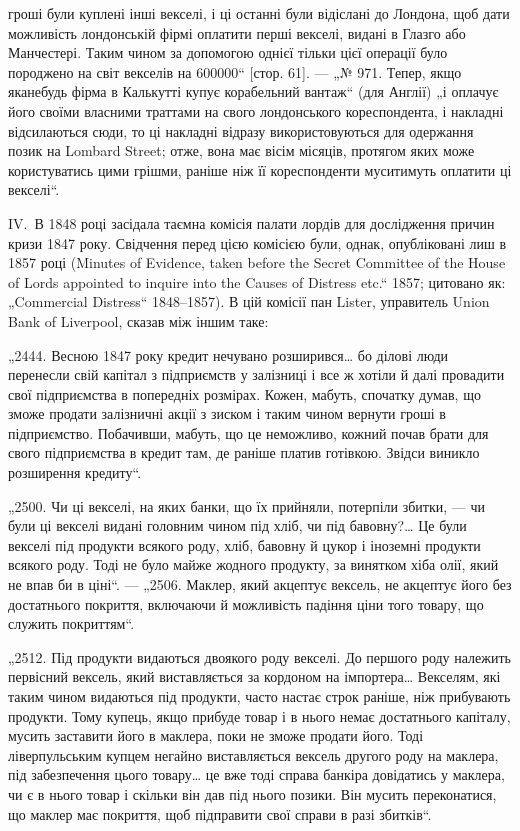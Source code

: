 гроші були куплені інші векселі, і ці останні були відіслані до Лондона,
щоб дати можливість лондонській фірмі оплатити перші векселі, видані в Глазго
або Манчестері. Таким чином за допомогою однієї тільки цієї операції було породжено
на світ векселів на \num{600000}“ [стор. 61]. — „№ 971.
Тепер, якщо яканебудь фірма в Калькутті купує корабельний вантаж“ (для Англії)
„і оплачує його своїми власними траттами на свого лондонського кореспондента,
і накладні відсилаються сюди, то ці накладні відразу використовуються для одержання позик на Lombard
Street; отже, вона має вісім місяців, протягом яких
може користуватись цими грішми, раніше ніж її кореспонденти муситимуть
оплатити ці векселі“.

IV.~В 1848 році засідала таємна комісія палати лордів для дослідження причин
кризи 1847 року. Свідчення перед цією комісією були, однак, опубліковані
лиш в 1857 році (Minutes of Evidence, taken before the Secret Committee of the
House of Lords appointed to inquire into the Causes of Distress etc.“ 1857; цитовано як: „Commercial
Distress“ 1848--1857). В цій комісії пан Lister, управитель
Union Bank of Liverpool, сказав між іншим таке:

„2444. Весною 1847 року кредит нечувано розширився\dots{} бо ділові люди
перенесли свій капітал з підприємств у залізниці і все ж хотіли й далі провадити свої підприємства в
попередніх розмірах. Кожен, мабуть, спочатку думав,
що зможе продати залізничні акції з зиском і таким чином вернути гроші в підприємство. Побачивши,
мабуть, що це неможливо, кожний почав брати для свого
підприємства в кредит там, де раніше платив готівкою. Звідси виникло розширення кредиту“.

„2500. Чи ці векселі, на яких банки, що їх прийняли, потерпіли збитки, — чи
були ці векселі видані головним чином під хліб, чи під бавовну?\dots{} Це були
векселі під продукти всякого роду, хліб, бавовну й цукор і іноземні продукти всякого роду. Тоді не
було майже жодного продукту, за винятком хіба
олії, який не впав би в ціні“. — „2506. Маклер, який акцептує вексель, не акцептує його без
достатнього покриття, включаючи й можливість падіння ціни того
товару, що служить покриттям“.

„2512. Під продукти видаються двоякого роду векселі. До першого роду належить первісний вексель,
який виставляється за кордоном на імпортера\dots{} Векселям,
які таким чином видаються під продукти, часто настає строк раніше, ніж прибувають продукти. Тому
купець, якщо прибуде товар і в нього немає достатнього
капіталу, мусить заставити його в маклера, поки не зможе продати його. Тоді
ліверпульським купцем негайно виставляється вексель другого роду на маклера,
під забезпечення цього товару\dots{} це вже тоді справа банкіра довідатись у маклера, чи є в нього товар
і скільки він дав під нього позики. Він мусить переконатися, що маклер має покриття, щоб підправити
свої справи в разі збитків“.

